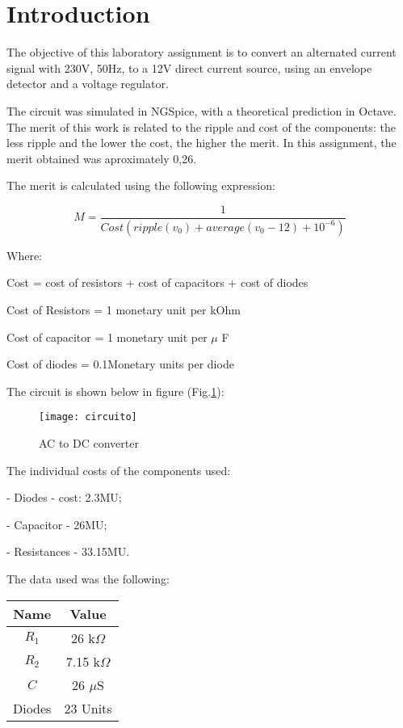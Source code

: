 \section{Introduction}
\label{sec:introduction}

The objective of this laboratory assignment is to convert an alternated current signal with 230V, 50Hz, to a 12V direct current source, using an envelope detector and a voltage regulator.\par
The circuit was simulated in NGSpice, with a theoretical prediction in Octave. The merit of this work is related to the ripple and cost of the components: the less ripple and the lower the cost, the higher the merit. In this assignment, the merit obtained was aproximately 0,26. 

The merit is calculated using the following expression:\par
\begin{equation}
    M = \frac{1}{Cost(ripple(v_0)+average(v_0-12)+10^{-6})}
\end{equation}\par
Where: \par
Cost = cost of resistors + cost of capacitors + cost of diodes \par
Cost of Resistors = 1 monetary unit per kOhm \par
Cost of capacitor = 1 monetary unit per $\mu$ F \par
Cost of diodes = 0.1Monetary units per diode \par
The circuit is shown below in figure (Fig.\ref{fig:circuito}): \par

\begin{figure}[H]
\centering
\texttt{[image: circuito]}
\caption{AC to DC converter}
\label{fig:circuito}
\end{figure}

The individual costs of the components used: \par
- Diodes - cost: 2.3MU; \par
- Capacitor - 26MU; \par
- Resistances - 33.15MU. \par

The data used was the following:

\begin{center}
  \begin{tabular}{ | c | c | }
    \hline    
    {\bf Name} & {\bf Value} \\ \hline
    $R_1$ & 26 k$\Omega$ \\ \hline 
    $R_2$ & 7.15 k$\Omega$ \\ \hline 
    $C$ & 26 $\mu$S \\ \hline
    Diodes & 23 Units \\ 
    \hline
  \end{tabular}
\end{center}